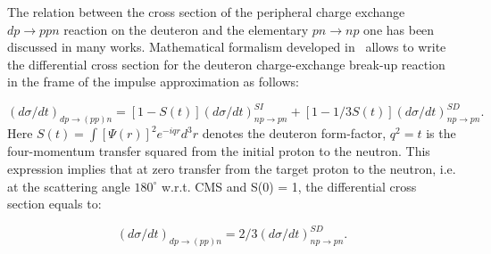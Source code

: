 \documentclass[a4paper,12pt]{article}
\begin{document}
The relation between the cross section of the peripheral charge exchange
$ dp \to ppn $ reaction on the deuteron and the elementary $pn \to  np$ one has
been discussed in many works. Mathematical formalism developed in~\cite{a8,a9}
allows to write the differential cross section for the deuteron charge-exchange
break-up reaction in the frame of the impulse approximation as follows:

\begin{displaymath}
  (d \sigma /dt)_{dp\rightarrow(pp)n} = [1-S(t)] (d \sigma
  /dt)^{SI}_{np\rightarrow pn} + [1-1/3S(t)] (d \sigma
  /dt)^{SD}_{np\rightarrow pn}.
\end{displaymath}
Here $S(t)= \int [\Psi(r)]^{2}e^{-iqr}d^{3}r$ denotes the deuteron form-factor,
$q^2 = t$ is the four-momentum transfer squared from the initial proton to the
neutron. This expression implies that at zero transfer from the target proton to
the neutron, i.e. at the scattering angle $180^{\circ}$ w.r.t. CMS and S(0) = 1,
the differential cross section equals to:

\begin{displaymath}
  (d \sigma /dt)_{dp\rightarrow(pp)n} = 2/3 (d \sigma
  /dt)^{SD}_{np\rightarrow pn}.
\end{displaymath}
\end{document}
